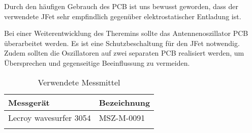 Durch den häufigen Gebrauch des PCB ist uns bewusst geworden, dass der verwendete JFet sehr empfindlich gegenüber elektrostatischer Entladung ist.

Bei einer Weiterentwicklung des Theremins sollte das Antennenoszillator PCB überarbeitet werden. Es ist eine Schutzbeschaltung für den JFet notwendig. Zudem sollten die Oszillatoren auf zwei separaten PCB realisiert werden, um Übersprechen und gegenseitige Beeinflussung zu vermeiden. 

\begin{table}[H]
	\centering
	\caption{Verwendete Messmittel}
	\label{tab:Verwendete_Messmittel}
	\begin{tabular}{l|l}
		\textbf{Messgerät} & \textbf{Bezeichnung}	\\
		\hline \hline
		
		Lecroy wavesurfer 3054  &  MSZ-M-0091  \\ 
		&        \\ 
		\hline
		
	\end{tabular}
\end{table} 